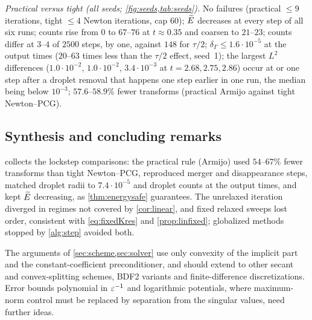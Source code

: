 \emph{Practical versus tight (all seeds; \cref{fig:seeds,tab:seeds}).} No failures (practical $\le9$ iterations, tight $\le4$ Newton iterations, cap $60$); $\Et$ decreases at every step of all six runs; counts rise from $0$ to $67$--$76$ at $t\approx0.35$ and coarsen to $21$--$23$; counts differ at $3$--$4$ of $2500$ steps, by one, against $148$ for $\tau/2$; $\delta_\Gamma\le1.6\cdot10^{-5}$ at the output times ($20$--$63$ times less than the $\tau/2$ effect, seed~1); the largest $L^2$ differences ($1.0\cdot10^{-2}$, $1.0\cdot10^{-2}$, $3.4\cdot10^{-3}$ at $t=2.68,2.75,2.86$) occur at or one step after a droplet removal that happens one step earlier in one run, the median being below $10^{-3}$; $57.6$--$58.9\%$ fewer transforms (practical Armijo against tight Newton--PCG).

\subsection{Synthesis and concluding remarks}\label{sec:conclusion}
\begin{table}[tbp]
\caption{Practical rule with Armijo inner method (p) versus tightly converged Newton--PCG (t) on all lockstep runs: steps, total transforms, saving, topological events (merger or disappearance steps; for the seeds, steps with different droplet counts), largest $L^2$ difference, largest (T$_E$) ratio and mass drift. $\Et$ decreased at every step of every run.}\label{tab:summary}
\centering\scriptsize\setlength{\tabcolsep}{3pt}

\end{table}

 collects the lockstep comparisons: the practical rule (Armijo) used $54$--$67\%$ fewer transforms than tight Newton--PCG, reproduced merger and disappearance steps, matched droplet radii to $7.4\cdot10^{-5}$ and droplet counts at the output times, and kept $\Et$ decreasing, as \cref{thm:energysafe} guarantees. The unrelaxed iteration diverged in regimes not covered by \cref{cor:linear}, and fixed relaxed sweeps lost order, consistent with \eqref{eq:fixedKres} and \cref{prop:linfixed}; globalized methods stopped by \cref{alg:step} avoided both.

The arguments of \cref{sec:scheme,sec:solver} use only convexity of the implicit part and the constant-coefficient preconditioner, and should extend to other secant and convex-splitting schemes, BDF2 variants and finite-difference discretizations. Error bounds polynomial in $\varepsilon^{-1}$ and logarithmic potentials, where maximum-norm control must be replaced by separation from the singular values, need further ideas.

